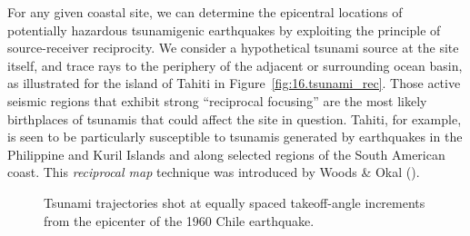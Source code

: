 For any given coastal site, we can determine the epicentral
locations of potentially hazardous tsunamigenic earthquakes by
exploiting the principle of source-receiver reciprocity.
We consider a hypothetical tsunami source at the site itself,
and trace rays to the periphery of the adjacent or surrounding
ocean basin, as illustrated for the island of
Tahiti in Figure~\ref{fig:16.tsunami_rec}.  Those active seismic
regions that exhibit strong ``reciprocal focusing'' are the most
likely birthplaces of tsunamis that could affect the site in question.
Tahiti, for example, is seen to be particularly susceptible to
tsunamis generated by earthquakes in the Philippine and Kuril
Islands and along selected regions of the South American coast.
This {\em reciprocal map\/}
%
technique was introduced by Woods \& Okal (\citeyear{woods&okal87}).
\begin{figure}
\begin{center}
\end{center}
\caption[tsunamis]{\label{fig:16.tsunamis}
Tsunami trajectories shot at equally spaced takeoff-angle
increments from the epicenter of the 1960 Chile earthquake.}
\end{figure}

